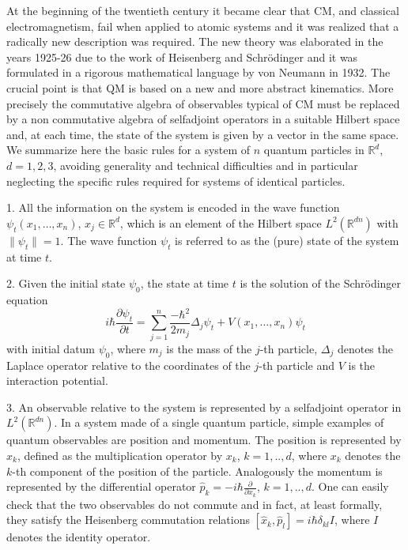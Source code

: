 \documentclass[12pt,reqno]{amsart}
\newcommand{\erre}{\mathbb{R}}
\newcommand{\n}{\relax}
\newcommand{\vs}{\medskip}
\newcommand{\f}{\frac}
\newcommand{\be}{\begin{equation}}
\newcommand{\ee}{\end{equation}}
\numberwithin{equation}{section}
\begin{document}
\n
At the beginning of the twentieth century it became clear that CM, and classical electromagnetism, fail when applied to atomic systems and it was realized that a radically new description was required. The new theory was elaborated in the years 1925-26 due to the work of Heisenberg and Schr\"{o}dinger and  it was formulated in a rigorous mathematical language by von Neumann in 1932. 
The crucial point is that QM is based on a new and more abstract kinematics. 
More precisely the commutative algebra of observables typical of CM must be replaced by a non commutative algebra of selfadjoint operators in a suitable Hilbert space and, at each time,   
the state of the system is given by  a vector in the same space. 
We summarize here the basic rules for a system of $n$ quantum particles in $\erre^d$, $d=1,2,3$, avoiding  generality and technical difficulties  and in particular neglecting the specific rules required for systems of identical particles.

\vs

1. All the information on the system is encoded in the wave function $\psi_t (x_1, \ldots ,x_n)$, $x_j \in \erre^d$,  which is an element of the Hilbert space $L^2(\erre^{dn})$ with $\|\psi_t\|=1$. The wave function $\psi_t$ is referred to as the (pure) state of the system at time $t$.


2. Given the initial state $\psi_0$, the state at time $t$ is the solution of the Schr\"{o}dinger equation 
\be
i \hbar \f{\partial \psi_t}{\partial t}= \sum_{j=1}^{n} \f{- \hbar^2}{2m_j} \Delta_j \psi_t + V(x_1, \ldots,x_n) \psi_t
\ee
with initial datum $\psi_0$, where $m_j$ is the mass of the $j$-th particle, $\Delta_j$ denotes the Laplace operator relative to the coordinates of the $j$-th particle and $V$ is the interaction potential.

3.  An observable relative to the system is represented by a selfadjoint operator in $L^2(\erre^{dn})$.   In a system made of a single quantum particle, simple examples of quantum observables are  position and  momentum.  The position  is represented by $\hat{x}_{k}$, defined as the multiplication operator by $x_{k}$, $k=1,..,d$, where $x_{k}$ denotes the $k$-th component of the position of the particle.  Analogously  the momentum  is represented by the differential operator $\hat{p}_{k}=-i\hbar \f{\partial}{\partial x_{k}}$, $k=1,..,d$. One can easily check that the two observables do not commute and in fact, at least  formally, they satisfy the Heisenberg commutation relations $[\hat{x}_{k}, \hat{p}_l ] = i \hbar \delta_{k l} I$, where $I$ denotes the identity operator. 
\end{document}
